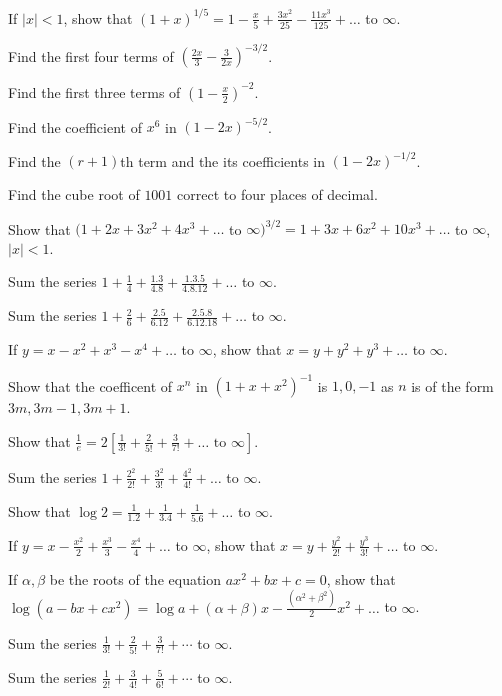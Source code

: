 \item If $|x| < 1$, show that $(1 + x)^{1/5} = 1 - \frac{x}{5} + \frac{3x^2}{25} - \frac{11x^3}{125} + \ldots$ to $\infty$.
\item Find the first four terms of $\left(\frac{2x}{3} - \frac{3}{2x}\right)^{-3/2}$.
\item Find the first three terms of $\left(1 - \frac{x}{2}\right)^{-2}$.
\item Find the coefficient of $x^6$ in $(1 - 2x)^{-5/2}$.
\item Find the $(r + 1)$th term and the its coefficients in $(1 - 2x)^{-1/2}$.
\item Find the cube root of $1001$ correct to four places of decimal.
\item Show that $(1 + 2x + 3x^2 + 4x^3 + \ldots $ to $\infty)^{3/2} = 1 + 3x + 6x^2 + 10x^3 + \ldots$ to $\infty$, $|x|< 1$.
\item Sum the series $1 + \frac{1}{4} + \frac{1.3}{4.8} + \frac{1.3.5}{4.8.12} + \ldots$ to $\infty$.
\item Sum the series $1 + \frac{2}{6} + \frac{2.5}{6.12} + \frac{2.5.8}{6.12.18} + \ldots$ to $\infty$.
\item If $y = x - x^2 + x^3 - x^4 + \ldots$ to $\infty$, show that $x = y + y^2 + y^3 + \ldots$ to $\infty$.
\item Show that the coefficent of $x^n$ in $(1 + x + x^2)^{-1}$ is $1, 0, -1$ as $n$ is of the form $3m, 3m - 1, 3m + 1$.
\item Show that $\frac{1}{e} = 2\left[\frac{1}{3!} + \frac{2}{5!} + \frac{3}{7!} + \ldots\text{~to~}\infty\right]$.
\item Sum the series $1 + \frac{2^2}{2!} + \frac{3^2}{3!} + \frac{4^2}{4!} + \ldots$ to $\infty$.
\item Show that $\log 2 = \frac{1}{1.2} + \frac{1}{3.4} + \frac{1}{5.6} + \ldots$ to $\infty$.
\item If $y = x - \frac{x^2}{2} + \frac{x^3}{3} - \frac{x^4}{4} + \ldots$ to $\infty$, show that $x = y + \frac{y^2}{2!} +
  \frac{y^3}{3!} + \ldots$ to $\infty$.
\item If $\alpha, \beta$ be the roots of the equation $ax^2 + bx + c = 0$, show that $\log(a - bx + cx^2) = \log a + (\alpha +
  \beta)x - \frac{(\alpha^2 + \beta^2)}{2}x^2 + \ldots$ to $\infty$.
\item Sum the series $\frac{1}{3!} + \frac{2}{5!} + \frac{3}{7!} + \cdots$ to $\infty$.
\item Sum the series $\frac{1}{2!} + \frac{3}{4!} + \frac{5}{6!} + \cdots$ to $\infty$.
